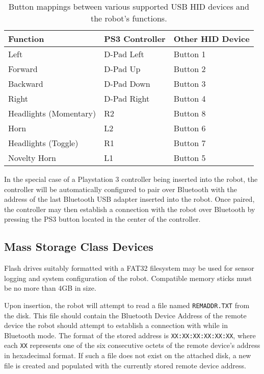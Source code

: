\begin{table}[H]
	\begin{center}
		\begin{tabular}{ | l | l | l |}
			\hline
			\textbf{Function}		& \textbf{PS3 Controller}	& \textbf{Other HID Device} \\ \hline

			Left					& D-Pad Left				& Button 1	\\ \hline
			Forward					& D-Pad Up					& Button 2	\\ \hline
			Backward				& D-Pad Down				& Button 3	\\ \hline
			Right					& D-Pad Right				& Button 4	\\ \hline
			Headlights (Momentary)	& R2						& Button 8	\\ \hline
			Horn					& L2						& Button 6	\\ \hline
			Headlights (Toggle)		& R1						& Button 7	\\ \hline
			Novelty Horn			& L1						& Button 5	\\ \hline

		\end{tabular}
		\caption[USB HID Robot Button Mappings]{Button mappings between various supported USB HID devices and the robot's functions.}
		\label{tab:robotbuttonmappings}
	\end{center}
\end{table}

In the special case of a Playstation 3 controller being inserted into the robot, the controller will be automatically configured to pair over Bluetooth with the address of the last Bluetooth USB adapter inserted into the robot. Once paired, the controller may then establish a connection with the robot over Bluetooth by pressing the PS3 button located in the center of the controller.

\subsection{Mass Storage Class Devices}

Flash drives suitably formatted with a FAT32 filesystem may be used for sensor logging and system configuration of the robot. Compatible memory sticks must be no more than 4GB in size.

Upon insertion, the robot will attempt to read a file named \texttt{REMADDR.TXT} from the disk. This file should contain the Bluetooth Device Address of the remote device the robot should attempt to establish a connection with while in Bluetooth mode. The format of the stored address is \texttt{XX:XX:XX:XX:XX:XX}, where each \texttt{XX} represents one of the six consecutive octets of the remote device's address in hexadecimal format. If such a file does not exist on the attached disk, a new file is created and populated with the currently stored remote device address.

